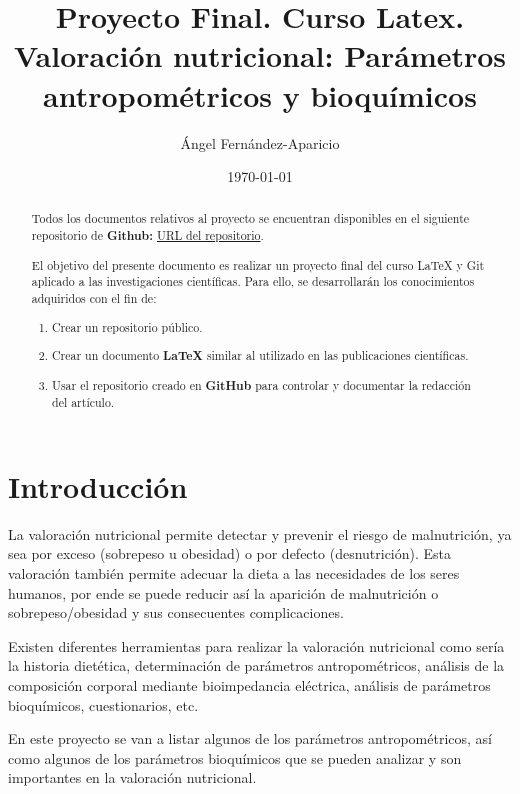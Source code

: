 \documentclass[a4paper,11pt]{article}
\begin{document}
	
\begin{titlepage}
	\title{\textbf{Proyecto Final. Curso Latex. Valoración nutricional: Parámetros antropométricos y bioquímicos}}
	\author{Ángel Fernández-Aparicio}
	\date{\today}
	\maketitle
\end{titlepage}
	
\tableofcontents
\newpage

\begin{abstract}
Todos los documentos relativos al proyecto se encuentran disponibles en el siguiente repositorio de \textbf{Github:} \href{https://github.com/anfeapa/proyecto_final}{URL del repositorio}.
		
El objetivo del presente documento es realizar un proyecto final del curso LaTeX y Git aplicado a las investigaciones científicas. Para ello, se desarrollarán los conocimientos adquiridos con el fin de:\begin{enumerate}
	\item Crear un repositorio público.
	\item Crear un documento \textbf{LaTeX }similar al utilizado en las publicaciones científicas.
	\item Usar el repositorio creado en \textbf{GitHub} para controlar y documentar la redacción del artículo.
	\end{enumerate} 
\end{abstract}
	
\section{Introducción}
La valoración nutricional permite detectar y prevenir el riesgo de malnutrición, ya sea por exceso (sobrepeso u obesidad) o por defecto (desnutrición). Esta valoración también permite adecuar la dieta a las necesidades de los seres humanos, por ende se puede reducir así la aparición de malnutrición o sobrepeso/obesidad y sus consecuentes complicaciones. 

Existen diferentes herramientas para realizar la valoración nutricional como sería la historia dietética, determinación de parámetros antropométricos, análisis de la composición corporal mediante bioimpedancia eléctrica, análisis de parámetros bioquímicos, cuestionarios, etc. 

En este proyecto se van a listar algunos de los parámetros antropométricos, así como algunos de los parámetros bioquímicos que se pueden analizar y son importantes en la valoración nutricional. 
\end{document}
